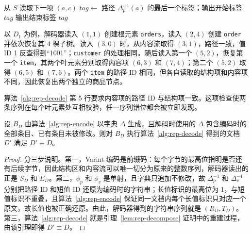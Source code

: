 \begin{algorithm}[htbp]
\caption{结构与内容协同恢复 $\textsc{Restore}$}
\label{alg:rep-decode}
从 $S$ 读取下一项 $(a,c)$\;
$\mathit{tag}\leftarrow$ 路径 $\Delta_p^{-1}(a)$ 的最后一个标签；输出开始标签 $\mathit{tag}$\;
输出结束标签 $\mathit{tag}$\;
\end{algorithm}

以 $D_1$ 为例，解码器读入 $(1,1)$ 创建根元素 \texttt{orders}，读入 $(2,4)$ 创建 \texttt{order} 并依次恢复其 4 棵子树。读入 $(3,0)$ 时，从内容流取得 $(3,1)$，路径一致，值 ID 1 反查得到“1001”；\texttt{customer} 的处理相同。随后读入第一个 $(5,2)$，恢复第一个 \texttt{item}，其两个叶元素分别取得内容项 $(6,3)$ 和 $(7,4)$；第二个 $(5,2)$ 取得 $(6,5)$ 和 $(7,6)$。两个 \texttt{item} 的路径 ID 相同，但各自读取的结构项和内容项不同，因此恢复出两个独立的商品节点。

算法~\ref{alg:rep-decode} 第 5 行要求内容项的路径 ID 与结构项一致。这项检查使两条序列在每个叶元素处互相校验，任一序列错位都会被立即发现。

\begin{theorem}[恢复正确性]
\label{thm:rep-restore}
设 $B_D$ 由算法~\ref{alg:rep-encode} 以字典 $\Delta$ 生成，且解码时使用的 $\Delta$ 包含编码时的全部条目、已有条目未被修改。则对 $B_D$ 执行算法~\ref{alg:rep-decode} 得到的文档 $D'$ 满足 $D'\equiv D$。
\end{theorem}

\begin{proof}
分三步说明。第一，Varint 编码是前缀码：每个字节的最高位指明是否还有后续字节，因此结构区和内容流可以唯一切分为原来的整数序列，解码器读出的正是 $S_D$ 和 $E_D$。第二，$\phi_p$ 和 $\phi_v$ 是单射，且字典只追加不修改，故 $\Delta_p^{-1}$ 和 $\Delta_v^{-1}$ 分别把路径 ID 和短值 ID 还原为编码时的字符串；长值标识的最高位为 1，与短值标识不重叠，且算法~\ref{alg:rep-encode} 保证同一文档内每个长值标识只对应一个原文，故长值也被正确还原。由此，解码器得到的字符串序列就是 $(R_D,T_D)$。第三，算法~\ref{alg:rep-decode} 就是引理~\ref{lem:rep-decompose} 证明中的重建过程，由该引理即得 $D'\equiv D$。
\end{proof}

